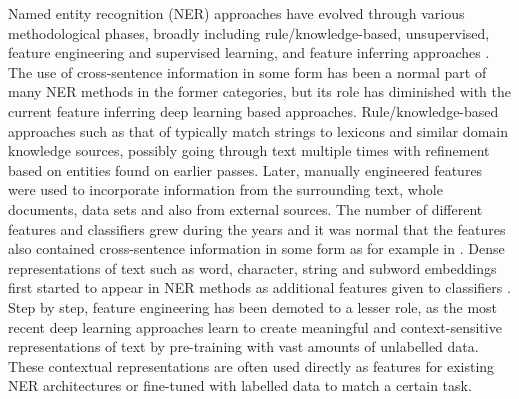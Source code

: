 Named entity recognition (NER) approaches have evolved through various methodological phases, broadly including rule/knowledge-based, unsupervised, feature engineering and supervised learning, and feature inferring approaches \cite{yadav-bethard-2018-survey,Li_2020}. The use of cross-sentence information in some form has been a normal part of many NER methods in the former categories, but its role has diminished with the current feature inferring deep learning based approaches. Rule/knowledge-based approaches such as that of  typically match strings to lexicons and similar domain knowledge sources, possibly going through text multiple times with refinement based on entities found on earlier passes. Later, manually engineered features were used to incorporate information from the surrounding text, whole documents, data sets and also from external sources. The number of different features and classifiers grew during the years and it was normal that the features also contained cross-sentence information in some form as for example in \cite{krishnan-manning-2006-effective}. Dense representations of text such as word, character, string and subword embeddings first started to appear in NER methods as additional features given to classifiers \cite{collobert2011}. Step by step, feature engineering has been demoted to a lesser role, as the most recent deep learning approaches learn to create meaningful and context-sensitive representations of text by pre-training with vast amounts of unlabelled data. These contextual representations are often used directly as features for existing NER architectures or fine-tuned with labelled data to match a certain task. 


